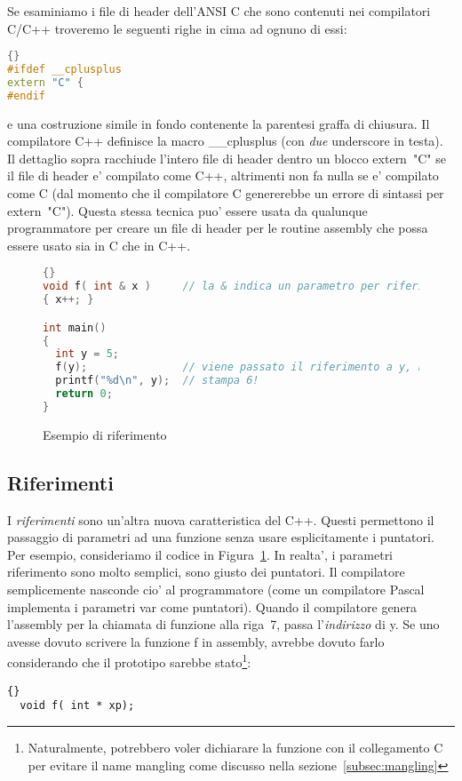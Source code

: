 Se esaminiamo i file di header dell'ANSI C che sono contenuti nei 
compilatori C/C++ troveremo le seguenti righe in cima ad ognuno di essi:
\begin{lstlisting}[stepnumber=0,language=C++]{}
#ifdef __cplusplus
extern "C" {
#endif
\end{lstlisting}
\noindent e una costruzione simile in fondo contenente la parentesi
graffa di chiusura. Il compilatore C++ definisce la macro {\code \_\_cplusplus}
(con \emph{due} underscore in testa). Il dettaglio sopra racchiude
l'intero file di header dentro un blocco {\code extern~"C"} se il 
file di header e' compilato come C++, altrimenti non fa nulla se e'
compilato come C (dal momento che il compilatore C genererebbe un
errore di sintassi per {\code extern~"C"}). Questa stessa tecnica
puo' essere usata da qualunque programmatore per creare un file di
header per le routine assembly che possa essere usato sia in C che 
in C++.

\begin{figure}
\begin{lstlisting}[language=C++,frame=tlrb]{}
void f( int & x )     // la & indica un parametro per riferimento
{ x++; }

int main()
{
  int y = 5;
  f(y);               // viene passato il riferimento a y, nessuna & qui!
  printf("%d\n", y);  // stampa 6!
  return 0;
}
\end{lstlisting}
\caption{Esempio di riferimento \label{fig:refex}}
\end{figure}

\subsection{Riferimenti}

I \emph{riferimenti} sono un'altra nuova caratteristica del C++. Questi
permettono il passaggio di parametri ad una funzione senza usare
esplicitamente i puntatori. Per esempio, consideriamo il codice in
Figura~\ref{fig:refex}. In realta', i parametri riferimento sono
molto semplici, sono giusto dei puntatori. Il compilatore semplicemente
nasconde cio' al programmatore (come un compilatore Pascal implementa
i parametri {\code var} come puntatori). Quando il compilatore genera
l'assembly per la chiamata di funzione alla riga~7, passa l'\emph{indirizzo}
di {\code y}. Se uno avesse dovuto scrivere la funzione {\code f} in assembly,
avrebbe dovuto farlo considerando che il prototipo sarebbe stato\footnote{
Naturalmente, potrebbero voler dichiarare la funzione con il collegamento
C per evitare il name mangling come discusso nella sezione~\ref{subsec:mangling}}:
\begin{lstlisting}[stepnumber=0]{}
  void f( int * xp);
\end{lstlisting}

